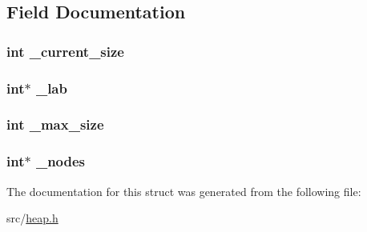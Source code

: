 \subsection{Field Documentation}
\hypertarget{structh_a2b3ba20b57b525879ffd03f99a3ba916}{
\subsubsection[{\-\_\-current\-\_\-size}]{\setlength{\rightskip}{0pt plus 5cm}int {\bf \-\_\-current\-\_\-size}}}\label{structh_a2b3ba20b57b525879ffd03f99a3ba916}
\hypertarget{structh_a3d4aadf6e58d62691fef211a1d405507}{
\subsubsection[{\-\_\-lab}]{\setlength{\rightskip}{0pt plus 5cm}int$\ast$ {\bf \-\_\-lab}}}\label{structh_a3d4aadf6e58d62691fef211a1d405507}
\hypertarget{structh_a3d03059f0a1bc2073f03e63e081f5569}{
\subsubsection[{\-\_\-max\-\_\-size}]{\setlength{\rightskip}{0pt plus 5cm}int {\bf \-\_\-max\-\_\-size}}}\label{structh_a3d03059f0a1bc2073f03e63e081f5569}
\hypertarget{structh_a97261eb8fa5f089f81128157bee1ed71}{
\subsubsection[{\-\_\-nodes}]{\setlength{\rightskip}{0pt plus 5cm}int$\ast$ {\bf \-\_\-nodes}}}\label{structh_a97261eb8fa5f089f81128157bee1ed71}


The documentation for this struct was generated from the following file\-:\begin{DoxyCompactItemize}
\item 
src/\hyperlink{heap_8h}{heap.\-h}\end{DoxyCompactItemize}
